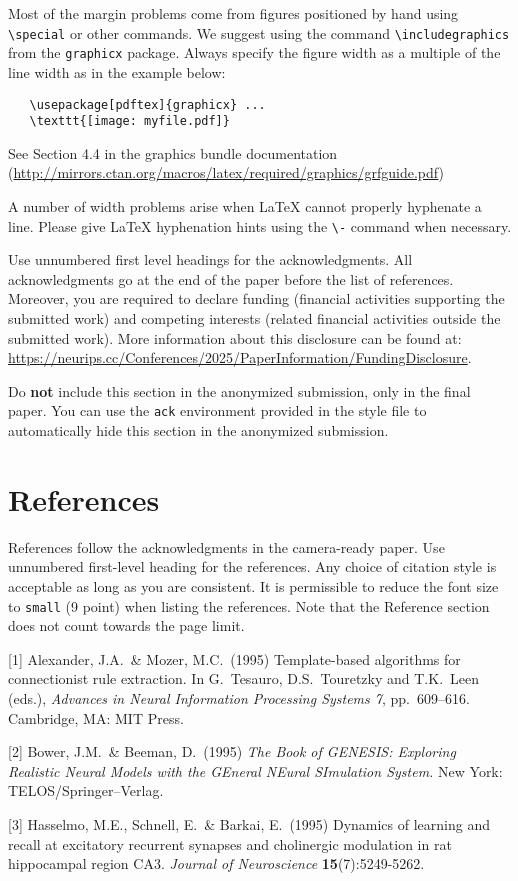 \documentclass{article}
\begin{document}
Most of the margin problems come from figures positioned by hand using
\verb+\special+ or other commands. We suggest using the command
\verb+\includegraphics+ from the \verb+graphicx+ package. Always specify the
figure width as a multiple of the line width as in the example below:
\begin{verbatim}
   \usepackage[pdftex]{graphicx} ...
   \texttt{[image: myfile.pdf]}
\end{verbatim}
See Section 4.4 in the graphics bundle documentation
(\url{http://mirrors.ctan.org/macros/latex/required/graphics/grfguide.pdf})


A number of width problems arise when \LaTeX{} cannot properly hyphenate a
line. Please give LaTeX hyphenation hints using the \verb+\-+ command when
necessary.

\begin{ack}
    Use unnumbered first level headings for the acknowledgments. All acknowledgments
    go at the end of the paper before the list of references. Moreover, you are required to declare
    funding (financial activities supporting the submitted work) and competing interests (related financial activities outside the submitted work).
    More information about this disclosure can be found at: \url{https://neurips.cc/Conferences/2025/PaperInformation/FundingDisclosure}.


    Do {\bf not} include this section in the anonymized submission, only in the final paper. You can use the \texttt{ack} environment provided in the style file to automatically hide this section in the anonymized submission.
\end{ack}

\section*{References}


References follow the acknowledgments in the camera-ready paper. Use unnumbered first-level heading for
the references. Any choice of citation style is acceptable as long as you are
consistent. It is permissible to reduce the font size to \verb+small+ (9 point)
when listing the references.
Note that the Reference section does not count towards the page limit.
\medskip


{
\small


[1] Alexander, J.A.\ \& Mozer, M.C.\ (1995) Template-based algorithms for
connectionist rule extraction. In G.\ Tesauro, D.S.\ Touretzky and T.K.\ Leen
(eds.), {\it Advances in Neural Information Processing Systems 7},
pp.\ 609--616. Cambridge, MA: MIT Press.


    [2] Bower, J.M.\ \& Beeman, D.\ (1995) {\it The Book of GENESIS: Exploring
        Realistic Neural Models with the GEneral NEural SImulation System.}  New York:
TELOS/Springer--Verlag.


[3] Hasselmo, M.E., Schnell, E.\ \& Barkai, E.\ (1995) Dynamics of learning and
recall at excitatory recurrent synapses and cholinergic modulation in rat
hippocampal region CA3. {\it Journal of Neuroscience} {\bf 15}(7):5249-5262.
}
\end{document}
